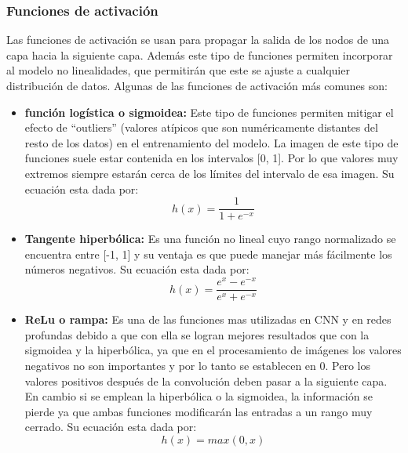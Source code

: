 \subsubsection{Funciones de activación}
Las funciones de activación se usan para propagar la salida de los nodos de una capa hacia la siguiente capa. Además este tipo de funciones permiten incorporar al modelo no linealidades, que permitirán que este se ajuste a cualquier distribución de datos. Algunas de las funciones de activación más comunes son:
\begin{itemize}
    \item \textbf{función logística o sigmoidea:} Este tipo de funciones permiten mitigar el efecto de ``outliers'' (valores atípicos que son numéricamente distantes del resto de los datos) en el entrenamiento del modelo. La imagen de este tipo de funciones suele estar contenida en los intervalos [0, 1]. Por lo que valores muy extremos siempre estarán cerca de los límites del intervalo de esa imagen. Su ecuación esta dada por:
    \begin{equation}
        h(x) = \frac{1}{1 + e^{-x}}
    \end{equation}
    \item \textbf{Tangente hiperbólica:} Es una función no lineal cuyo rango normalizado se encuentra entre [-1, 1] y su ventaja  es que puede manejar más fácilmente los números negativos. Su ecuación esta dada por:
    \begin{equation}
        h(x) = \frac{e^{x} - e^{-x}}{e^{x} + e^{-x}}
    \end{equation}
    \item \textbf{ReLu o rampa:} Es una de las funciones mas utilizadas en CNN y en redes profundas debido a que con ella se logran mejores resultados que con la sigmoidea y la hiperbólica, ya que en el procesamiento de imágenes los valores negativos  no son importantes y por lo tanto se establecen en 0. Pero los valores positivos después de la convolución deben pasar a la siguiente capa. En cambio si se emplean la hiperbólica o la sigmoidea,  la información se pierde ya que ambas funciones modificarán las entradas a un rango muy cerrado. Su ecuación esta dada por:
    \begin{equation}
        h(x) = max(0,x)
    \end{equation}
\end{itemize}
